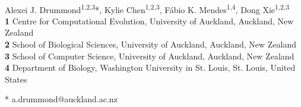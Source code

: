\documentclass[10pt,letterpaper,table]{article}
\begin{document}



\begin{flushleft}
{\Large
\textbf{} %
}
\newline
\\
Alexei J. Drummond\textsuperscript{1,2,3}*,
Kylie Chen\textsuperscript{1,2,3},
F\'{a}bio K. Mendes\textsuperscript{1,4},
Dong Xie\textsuperscript{1,2,3}
\\
\bigskip
\textbf{1} Centre for Computational Evolution, University of Auckland, Auckland, New Zealand
\\
\textbf{2} School of Biological Sciences, University of Auckland, Auckland, New Zealand
\\
\textbf{3} School of Computer Science, University of Auckland, Auckland, New Zealand
\\
\textbf{4} Department of Biology, Washington University in St. Louis, St. Louis, United States
\\
\bigskip

% 
%

* a.drummond@auckland.ac.nz

\end{flushleft}

\end{document}
